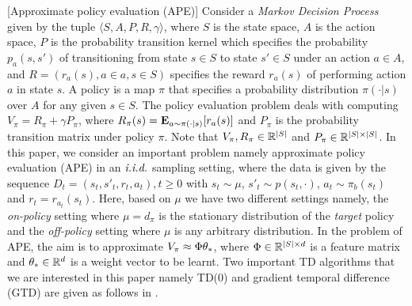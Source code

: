 \begin{example}\label{ex:ape}[Approximate policy evaluation (APE)]
Consider a \emph{Markov Decision Process} given by the tuple $\langle S,A,P,R,\gamma \rangle$, where $S$ is the state space, $A$ is the action space, $P$ is the probability transition kernel which specifies the probability $p_a(s,s')$ of transitioning from state $s\in S$ to state $s'\in S$ under an action $a\in A$, and $R=(r_a(s),a\in a,s\in S)$ specifies the reward $r_a(s)$ of performing action $a$ in state $s$. A policy is a map $\pi$ that specifies a probability distribution $\pi(\cdot | s)$ over $A$ for any given $s \in S$. The policy evaluation problem deals with computing $V_\pi=R_\pi+\gamma P_\pi$, where $R_\pi(s)=\mathbf{E}_{a\sim \pi(\cdot|s)}[r_a(s)]$ and $P_\pi$ is the probability transition matrix under policy $\pi$. Note that $V_\pi,R_\pi \in \mathbb{R}^{|S|}$ and $P_\pi\in\mathbb{R}^{|S|\times|S|}$. 
In this paper, we consider an important problem namely approximate policy evaluation (APE) in an $\emph{i.i.d.}$ sampling setting, where the data is given by the sequence  $D_t=(s_t,s'_t,r_t,a_t),t\geq 0$ with $s_t\sim \mu$,  $s'_t\sim p(s_t,\cdot)$, $a_t\sim\pi_b(s_t)$ and $r_t=r_{a_t}(s_t)$. Here, based on $\mu$ we have two different settings namely, the \emph{on-policy} setting where $\mu=d_{\pi}$ is the stationary distribution of  the \emph{target} policy and the \emph{off-policy} setting where $\mu$ is any arbitrary distribution. In the problem of APE, the aim is to approximate $V_\pi \approx \Phi \theta_*$, where $\Phi\in \mathbb{R}^{|S|\times d}$ is a feature matrix and $\theta_*\in\mathbb{R}^d$ is a weight vector to be learnt. Two important TD algorithms that we are interested in this paper namely  TD(0) and gradient temporal difference (GTD) are given as follows in .
\end{example}
{}
